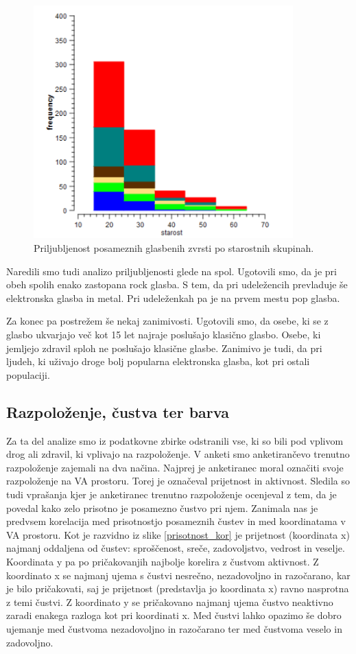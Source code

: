 \documentclass[a4paper, 12pt]{book}
\begin{document}
{\begin{figure}[hbt]
\centering
\includegraphics[width=10cm]{images/genretop.png}

\caption{Priljubljenost posameznih glasbenih zvrsti po starostnih skupinah.  }
\label{zanrigraftop}
\end{figure}

Naredili smo tudi analizo priljubljenosti glede na spol. Ugotovili smo, da je pri obeh spolih enako zastopana rock glasba. S tem, da pri udeležencih prevladuje še elektronska glasba in metal. Pri udeleženkah pa je na prvem mestu pop glasba. 

Za konec pa postrežem še nekaj zanimivosti. Ugotovili smo, da osebe, ki se z glasbo ukvarjajo več kot 15 let najraje poslušajo klasično glasbo. Osebe, ki jemljejo zdravil sploh ne poslušajo klasične glasbe. Zanimivo je tudi, da pri ljudeh, ki uživajo droge bolj popularna elektronska glasba, kot pri ostali populaciji.

\subsection{Razpoloženje, čustva ter barva}

Za ta del analize smo iz podatkovne zbirke odstranili vse, ki so bili pod vplivom drog ali zdravil, ki vplivajo na razpoloženje. V anketi smo anketirančevo trenutno razpoloženje zajemali na dva načina. Najprej je anketiranec moral označiti svoje razpoloženje na VA prostoru. Torej je označeval prijetnost in aktivnost. Sledila so tudi vprašanja kjer je anketiranec trenutno razpoloženje ocenjeval z tem, da je povedal kako zelo prisotno je posamezno čustvo pri njem. Zanimala nas je predvsem korelacija med prisotnostjo posameznih čustev in med koordinatama v VA prostoru. Kot je razvidno iz slike \ref{prisotnost_kor} je prijetnost (koordinata x) najmanj oddaljena od čustev: sproščenost, sreče, zadovoljstvo, vedrost in veselje. Koordinata y pa po pričakovanjih najbolje korelira z čustvom aktivnost. Z koordinato  x se najmanj ujema s čustvi nesrečno, nezadovoljno in razočarano, kar je bilo pričakovati, saj je prijetnost (predstavlja jo koordinata x) ravno nasprotna z temi čustvi. Z koordinato y se pričakovano najmanj ujema čustvo neaktivno zaradi enakega razloga kot pri koordinati x. Med čustvi lahko opazimo še dobro ujemanje med čustvoma nezadovoljno in razočarano ter med čustvoma veselo in zadovoljno. 

}
\end{document}

